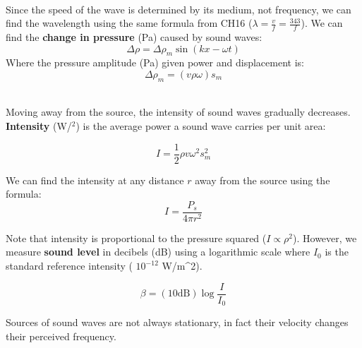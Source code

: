 \documentclass[11pt]{article}
\begin{document}
    \noindent \\ Since the speed of the wave is determined by its medium, not frequency,
    we can find the wavelength using the same formula from CH16 ($\lambda = \frac{v}{f} = \frac{343}{f}$).
    We can find the \textbf{change in pressure} (Pa) caused by sound waves:
    \begin{equation}
       \Delta \rho = \Delta \rho_m \sin(kx - \omega t) \tag{pressure}
    \end{equation}
    Where the pressure amplitude (Pa) given power and displacement is:
    \begin{equation}
     \Delta \rho_m = (v \rho \omega)s_m \tag{pressure amplitude}
    \end{equation}

    \noindent \\ Moving away from the source, the intensity of sound waves gradually decreases.
    \textbf{Intensity} (W/$^{2}$) is the average power a sound wave carries per unit area:

    \begin{equation}
        I = \frac{1}{2} \rho v \omega^2 s_{m}^2 \tag{intensity}\label{eq:intensity}
    \end{equation}

    \noindent We can find the intensity at any distance $r$ away from the source using the formula:
    \begin{equation}
        I = \frac{P_s}{4 \pi r^2} \tag{intensity at distance r}
    \end{equation}

    \noindent Note that intensity is proportional to the pressure squared
    ($I \propto \rho^2$).
    However, we measure \textbf{sound level} in decibels (dB) using a logarithmic scale
    where $I_0$ is the standard reference intensity ( $10^{-12}$ W/m^2).

    \begin{equation}
        \beta = (10 \text{dB}) \log \frac{I}{I_0} \tag{sound level}
    \end{equation}

    \noindent Sources of sound waves are not always stationary,
    in fact their velocity changes their perceived frequency.
\end{document}
